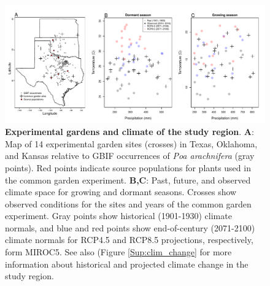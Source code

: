 \documentclass[12pt]{article}\usepackage[]{graphicx}\usepackage[dvipsnames]{xcolor}
\begin{document}
\begin{figure}[H]
  \begin{center}
    \includegraphics[width=1\linewidth]{Figures/tom_map_v2.pdf}
  \caption{\textbf{Experimental gardens and climate of the study region}. 
  	\textbf{A}: Map of 14 experimental garden sites (crosses) in Texas, Oklahoma, and Kansas relative to GBIF occurrences of \textit{Poa arachnifera} (gray points). Red points indicate source populations for plants used in the common garden experiment. 
  	\textbf{B,C}: Past, future, and observed climate space for growing and dormant seasons. Crosses show observed conditions for the sites and years of the common garden experiment. Gray points show historical (1901-1930) climate normals, and blue and red points show end-of-century (2071-2100) climate normals for RCP4.5 and RCP8.5 projections, respectively, form MIROC5. 
  See also (Figure \ref{Sup:clim_change} for more information about historical and projected climate change in the study region.}
  \label{fig:study_design}
  \end{center}
\end{figure}
\end{document}
